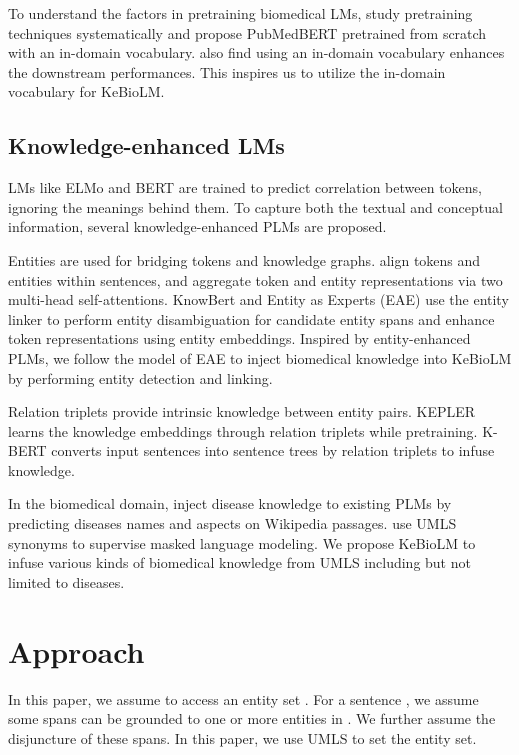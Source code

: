 \documentclass[11pt]{article}
\begin{document}
To understand the factors in pretraining biomedical LMs, 
\citet{gu2020domain} study pretraining techniques systematically
and propose PubMedBERT pretrained from scratch with an in-domain vocabulary.
\citet{lewis-etal-2020-pretrained} also find using an in-domain vocabulary enhances the downstream performances.
This inspires us to utilize the in-domain vocabulary for KeBioLM.




\subsection{Knowledge-enhanced LMs}
LMs like ELMo and BERT are trained to predict
correlation between tokens,
ignoring the meanings behind them.
To capture both the textual and conceptual information,
several knowledge-enhanced PLMs are proposed.


Entities are used for bridging tokens and knowledge graphs.
\citet{zhang-etal-2019-ernie} align tokens and entities within sentences, and aggregate token and entity representations via two multi-head self-attentions.
KnowBert \cite{peters-etal-2019-knowledge} and Entity as Experts (EAE) \cite{fevry-etal-2020-entities} use the entity linker to perform entity disambiguation for candidate entity spans and enhance token representations using entity embeddings.
Inspired by entity-enhanced PLMs, we follow the model of EAE to inject biomedical knowledge into KeBioLM by performing entity detection and linking.

Relation triplets provide intrinsic knowledge between entity pairs.
KEPLER \cite{wang2019kepler} learns the knowledge embeddings through relation triplets while pretraining.
K-BERT \cite{Liu_Zhou_Zhao_Wang_Ju_Deng_Wang_2020} converts input sentences into sentence trees by relation triplets to infuse knowledge.

In the biomedical domain, \citet{he-etal-2020-infusing} inject disease knowledge to existing PLMs by predicting diseases names and aspects on Wikipedia passages.
\citet{michalopoulos2020umlsbert} use UMLS synonyms to supervise masked language modeling.
We propose KeBioLM to infuse various kinds of biomedical knowledge from UMLS including but not limited to diseases.


\section{Approach}

In this paper, we assume to access an entity set .
For a sentence ,
we assume some spans  can be grounded to
one or more entities in .
We further assume the disjuncture of these spans.
In this paper, we use UMLS to set the entity set.
\end{document}
